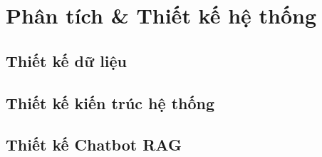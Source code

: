 \section{Phân tích \& Thiết kế hệ thống}
\subsection{Thiết kế dữ liệu}


\subsection{Thiết kế kiến trúc hệ thống}


\newpage
\subsection{Thiết kế Chatbot RAG}

